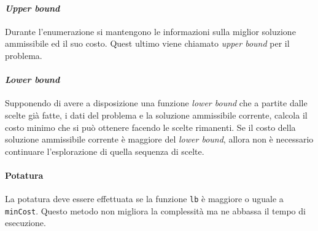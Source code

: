     \paragraph{\textit{Upper bound}}
        Durante l'enumerazione si mantengono le informazioni sulla miglior soluzione ammissibile ed il suo costo. Quest ultimo viene chiamato \textit{upper bound} per il problema.
    \paragraph{\textit{Lower bound}}
        Supponendo di avere a disposizione una funzione \textit{lower bound} che a partite dalle scelte già fatte, i dati del problema e la soluzione ammissibile corrente, calcola il costo minimo che si può ottenere facendo le scelte rimanenti. Se il costo della soluzione ammissibile corrente è maggiore del \textit{lower bound}, allora non è necessario continuare l'esplorazione di quella sequenza di scelte.
    \paragraph{Potatura}
        La potatura deve essere effettuata se la funzione \texttt{lb} è maggiore o uguale a \texttt{minCost}. Questo metodo non migliora la complessità ma ne abbassa il tempo di esecuzione.
